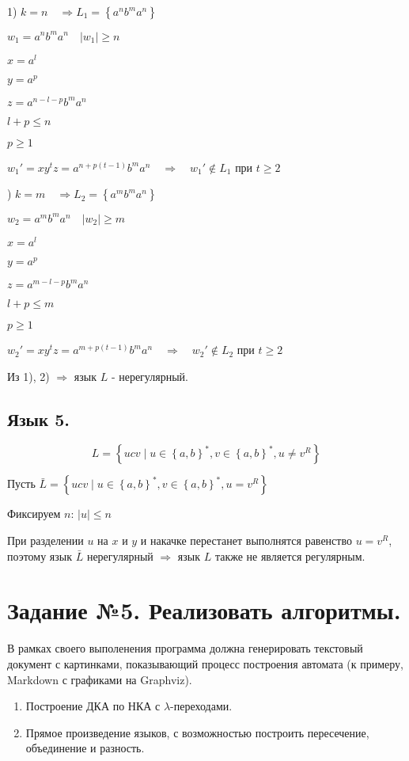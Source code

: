 \documentclass[a4paper]{article}
\begin{document}
1) $ k = n \quad \Rightarrow L_{1} = \left\{ a^{n}b^{m}a^{n} \right\} $
\bigskip

$ w_{1} = a^{n}b^{m}a^{n} \quad \left| w_{1} \right| \geq n$

$ x = a^{l} $

$ y = a^{p} $

$ z = a^{n-l-p}b^{m}a^{n} $

\bigskip
$ l+p \leq n $

$ p \geq 1 $

\bigskip
$ w_{1}' = xy^{t}z = a^{n+p(t-1)}b^{m}a^{n} \quad \Rightarrow \quad w_{1}' \notin L_{1} $ при $ t \geq 2 $

) $ k = m \quad \Rightarrow L_{2} = \left\{ a^{m}b^{m}a^{n} \right\} $
\bigskip

$ w_{2} = a^{m}b^{m}a^{n} \quad \left| w_{2} \right| \geq m$

$ x = a^{l} $

$ y = a^{p} $

$ z = a^{m-l-p}b^{m}a^{n} $
\bigskip

$ l+p \leq m $

$ p \geq 1 $
\bigskip

$ w_{2}' = xy^{t}z = a^{m+p(t-1)}b^{m}a^{n} \quad \Rightarrow \quad w_{2}' \notin L_{2} $ при $ t \geq 2 $
\bigskip

Из 1), 2) $ \Rightarrow $ язык $ L $ - нерегулярный.
\subsection{Язык 5.}
$$ L = \left\{ ucv \mid u \in \left\{ a, b \right\}^{*}, v \in \left\{ a, b \right\}^{*}, u \neq v^{R}\right\} $$

Пусть $ \bar{L} = \left\{ ucv \mid u \in \left\{ a, b \right\}^{*}, v \in \left\{ a, b \right\}^{*}, u = v^{R}\right\}  $

Фиксируем $ n $: $ \left| u \right| \leq n$

При разделении $ u $ на $ x $ и $ y $ и накачке перестанет выполнятся равенство $ u = v^{R} $, поэтому язык $ \bar{L} $ нерегулярный $ \Rightarrow $ язык $ L $ также не является регулярным. 

\section{Задание №5. Реализовать алгоритмы.}
В рамках своего выполенения программа должна генерировать текстовый документ с картинками, показывающий процесс построения автомата (к примеру, Markdown с графиками на Graphviz).

\begin{enumerate}
	\item Построение ДКА по НКА с $\lambda$-переходами.
	\item Прямое произведение языков, с возможностью построить пересечение, объединение и разность.
\end{enumerate}
\end{document}
